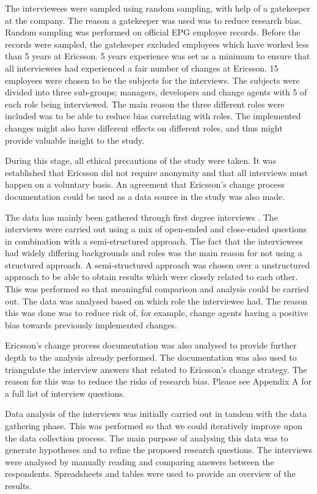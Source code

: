 \documentclass[10pt,twocolumn]{article}
\begin{document}
The interviewees were sampled using random sampling, with help of a gatekeeper at the company. The reason a gatekeeper was used was to reduce research bias. Random sampling was performed on official EPG employee records. Before the records were sampled, the gatekeeper excluded employees which have worked less than 5 years at Ericsson. 5 years experience was set as a minimum to ensure that all interviewees had experienced a fair number of changes at Ericsson. 15 employees were chosen to be the subjects for the interviews. The subjects were divided into three sub-groups; managers, developers and change agents with 5 of each role being interviewed. The main reason the three different roles were included was to be able to reduce bias correlating with roles. The implemented changes might also have different effects on different roles, and thus might provide valuable insight to the study.

During this stage, all ethical precautions of the study were taken. It was established that Ericsson did not require anonymity and that all interviews must happen on a voluntary basis. An agreement that Ericsson's change process documentation could be used as a data source in the study was also made. 


The data has mainly been gathered through first degree interviews \cite{lethbridge2005studying}. The interviews were carried out using a mix of open-ended and close-ended questions in combination with a semi-structured approach. The fact that the interviewees had widely differing backgrounds and roles was the main reason for not using a structured approach. A semi-structured approach was chosen over a unstructured approach to be able to obtain results which were closely related to each other. This was performed so that meaningful comparison and analysis could be carried out. The data was analysed based on which role the interviewee had. The reason this was done was to reduce risk of, for example, change agents having a positive bias towards previously implemented changes.

Ericsson's change process documentation was also analysed to provide further depth to the analysis already performed. The documentation was also used to triangulate the interview answers that related to Ericsson's change strategy. The reason for this was to reduce the risks of research bias. Please see Appendix A for a full list of interview questions.

Data analysis of the interviews was initially carried out in tandem with the data gathering phase. This was performed so that we could iteratively improve upon the data collection process. The main purpose of analysing this data was to generate hypotheses and to refine the proposed research questions. The interviews were analysed by manually reading and comparing answers between the respondents. Spreadsheets and tables were used to provide an overview of the results. 
\end{document}
